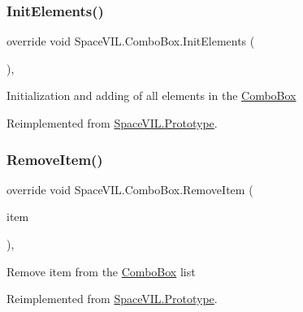 \subsubsection{\texorpdfstring{Init\+Elements()}{InitElements()}}
{\footnotesize\ttfamily override void Space\+V\+I\+L.\+Combo\+Box.\+Init\+Elements (\begin{DoxyParamCaption}{ }\end{DoxyParamCaption})\hspace{0.3cm}{\ttfamily [inline]}, {\ttfamily [virtual]}}



Initialization and adding of all elements in the \mbox{\hyperlink{class_space_v_i_l_1_1_combo_box}{Combo\+Box}} 



Reimplemented from \mbox{\hyperlink{class_space_v_i_l_1_1_prototype_ac3379fe02923ee155b5b0084abf27420}{Space\+V\+I\+L.\+Prototype}}.

\mbox{\label{class_space_v_i_l_1_1_combo_box_a646108f1b822d481ae32b68e7bd3f44f}} 
\subsubsection{\texorpdfstring{Remove\+Item()}{RemoveItem()}}
{\footnotesize\ttfamily override void Space\+V\+I\+L.\+Combo\+Box.\+Remove\+Item (\begin{DoxyParamCaption}\item[{\mbox{\hyperlink{interface_space_v_i_l_1_1_core_1_1_i_base_item}{I\+Base\+Item}}}]{item }\end{DoxyParamCaption})\hspace{0.3cm}{\ttfamily [inline]}, {\ttfamily [virtual]}}



Remove item from the \mbox{\hyperlink{class_space_v_i_l_1_1_combo_box}{Combo\+Box}} list 



Reimplemented from \mbox{\hyperlink{class_space_v_i_l_1_1_prototype_a7a2aabccfe6389f71d0265fa73f0ae87}{Space\+V\+I\+L.\+Prototype}}.

\mbox{\label{class_space_v_i_l_1_1_combo_box_a9e06cbc4b358a4e145284ed396da159b}} 
